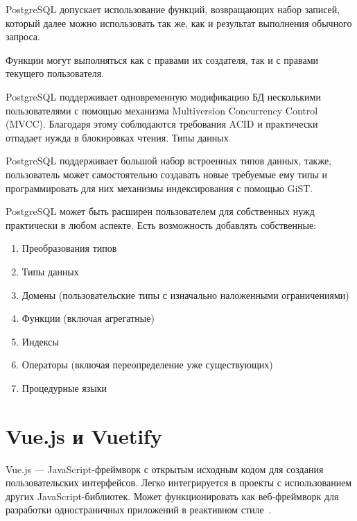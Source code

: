 \documentclass{altsu-report}
\begin{document}
PostgreSQL допускает использование функций, возвращающих набор записей, который далее можно использовать так же, как и результат выполнения обычного запроса.

Функции могут выполняться как с правами их создателя, так и с правами текущего пользователя.

PostgreSQL поддерживает одновременную модификацию БД несколькими пользователями с помощью механизма Multiversion Concurrency Control (MVCC). Благодаря этому соблюдаются требования ACID и практически отпадает нужда в блокировках чтения.
Типы данных

PostgreSQL поддерживает большой набор встроенных типов данных, также, пользователь может самостоятельно создавать новые требуемые ему типы и программировать для них механизмы индексирования с помощью GiST.

PostgreSQL может быть расширен пользователем для собственных нужд практически в любом аспекте. Есть возможность добавлять собственные:

\begin{enumerate}
    \item Преобразования типов
    
    \item Типы данных
    
    \item Домены (пользовательские типы с изначально наложенными ограничениями)
    
    \item Функции (включая агрегатные)
    
    \item Индексы
    
    \item Операторы (включая переопределение уже существующих)
    
    \item Процедурные языки
\end{enumerate}

\section*{Vue.js и Vuetify}

Vue.js --- JavaScript-фреймворк с открытым исходным кодом для создания пользовательских интерфейсов. Легко интегрируется в проекты с использованием других JavaScript-библиотек. Может функционировать как веб-фреймворк для разработки одностраничных приложений в реактивном стиле~\cite{Vue.js_wiki, Vue.js}.
\end{document}

